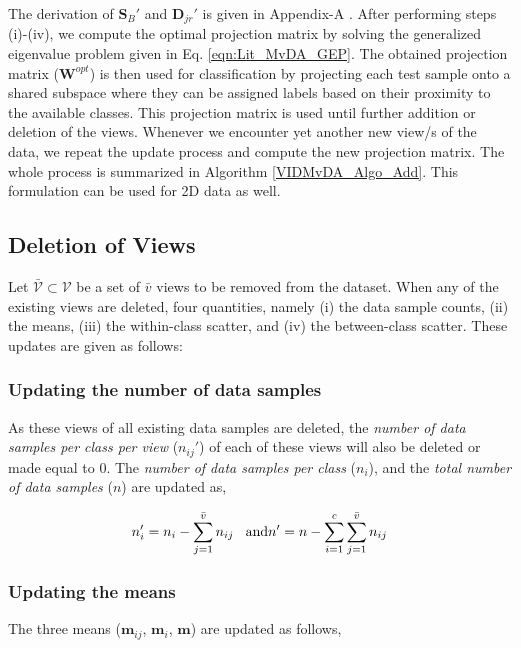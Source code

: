 The derivation of $\textbf{S}_{B}'$ and $\textbf{D}_{jr}'$ is given in Appendix-A%
. After performing steps (i)-(iv), we compute the optimal projection matrix by solving the generalized eigenvalue problem given in Eq. \ref{eqn:Lit_MvDA_GEP}. The obtained projection matrix ($\textbf{W}^{opt}$) is then used for classification by projecting each test sample onto a shared subspace where they can be assigned labels based on their proximity to the available classes. This projection matrix is used until further addition or deletion of the views. Whenever we encounter yet another new view/s of the data, we repeat the update process and compute the new projection matrix. The whole process is summarized in Algorithm \ref{VIDMvDA_Algo_Add}. This formulation can be used for 2D data as well.







\subsection{Deletion of Views}
\label{sub:VIDMvDA_Del_View}
Let $\bar{\mathcal{V}} \subset \mathcal{V}$ be a set of $\bar{v}$ views to be removed from the dataset. When any of the existing views are deleted, four quantities, namely (i) the data sample counts, (ii) the means, (iii) the within-class scatter, and (iv) the between-class scatter. These updates are given as follows:


\subsubsection{Updating the number of data samples}
\label{ssubs:VIDMvDA_Dec_n}
As these views of all existing data samples are deleted, the \textit{number of data samples per class per view} ($n_{ij}'$) of each of these views will also be deleted or made equal to $0$. The \textit{number of data samples per class} ($n_i$), and the \textit{total number of data samples} ($n$) are updated as,

\begin{equation}
\label{eqn:VIDMvDA_Del_n}
n'_i = n_i - \sum\limits_{j=1}^{\bar{v}} n_{ij} \hspace{0.3cm} \text{and} n' = n - \sum\limits_{i=1}^{c} \sum\limits_{j=1}^{\bar{v}} n_{ij}
\end{equation}




\subsubsection{Updating the means}
\label{ssubs:VIDMvDA_Dec_mu}
The three means ($\textbf{m}_{ij}$, $\textbf{m}_{i}$, $\textbf{m}$) are updated as follows,

